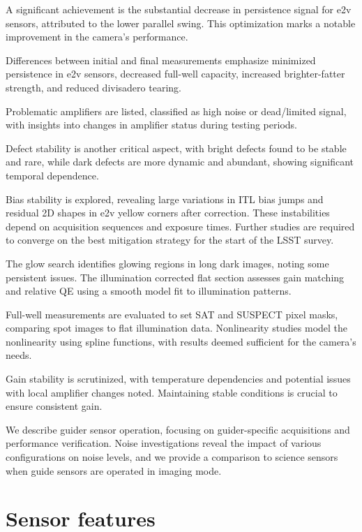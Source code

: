 A significant achievement is the substantial decrease in persistence signal for e2v sensors, attributed to the lower parallel swing. This optimization marks a notable improvement in the camera's performance.

Differences between initial and final measurements emphasize minimized persistence in e2v sensors, decreased full-well capacity, increased brighter-fatter strength, and reduced divisadero tearing.

Problematic amplifiers are listed, classified as high noise or dead/limited signal, with insights into changes in amplifier status during testing periods.

Defect stability is another critical aspect, with bright defects found to be stable and rare, while dark defects are more dynamic and abundant, showing significant temporal dependence.

Bias stability is explored, revealing large variations in ITL bias jumps and residual 2D shapes in e2v yellow corners after correction. These instabilities depend on acquisition sequences and exposure times. Further studies are required to converge on the best mitigation strategy for the start of the LSST survey.

The glow search identifies glowing regions in long dark images, noting some persistent issues. The illumination corrected flat section assesses gain matching and relative QE using a smooth model fit to illumination patterns.

Full-well measurements are evaluated to set SAT and SUSPECT pixel masks, comparing spot images to flat illumination data. Nonlinearity studies model the nonlinearity using spline functions, with results deemed sufficient for the camera's needs.

Gain stability is scrutinized, with temperature dependencies and potential issues with local amplifier changes noted. Maintaining stable conditions is crucial to ensure consistent gain.

We describe guider sensor operation, focusing on guider-specific acquisitions and performance verification. Noise investigations reveal the impact of various configurations on noise levels, and we provide a comparison to science sensors when guide sensors are operated in imaging mode.


\clearpage
\section{Sensor features}\label{sensor-features}

